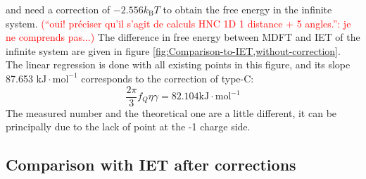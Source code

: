 and need a correction of $-2.556k_{\mathrm{B}}T$ to obtain the free
energy in the infinite system. \textcolor{red}{(``oui! préciser qu'il
s'agit de calculs HNC \textquotedbl{}1D\textquotedbl{} 1 distance
+ 5 angles.'': je ne comprends pas...)} The difference in free energy
between \acs{MDFT} and \acs{IET} of the infinite system are given
in figure \ref{fig:Comparison-to-IET,without-correction}. The linear
regression is done with all existing points in this figure, and its
slope 87.653 $\mathrm{kJ}\cdot\mathrm{mol^{-1}}$ corresponds to the
correction of type-C:
\begin{equation}
\dfrac{2\pi}{3}f_{Q}\eta\gamma=82.104\mathrm{kJ}\cdot\mathrm{mol^{-1}}\label{eq:eta-gamma}
\end{equation}
The measured number and the theoretical one are a little different,
it can be principally due to the lack of point at the -1 charge side.

\subsection{Comparison with IET after corrections}

